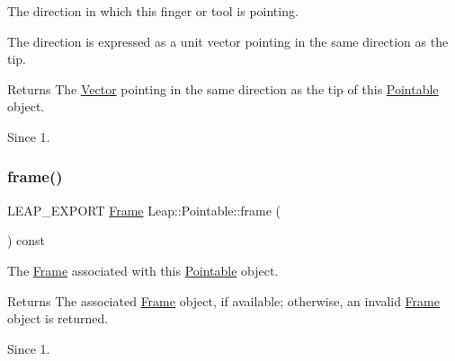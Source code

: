 The direction in which this finger or tool is pointing.


\begin{DoxyCodeInclude}
\end{DoxyCodeInclude}


The direction is expressed as a unit vector pointing in the same direction as the tip.



\begin{DoxyReturn}{Returns}
The \hyperlink{struct_leap_1_1_vector}{Vector} pointing in the same direction as the tip of this \hyperlink{class_leap_1_1_pointable}{Pointable} object. 
\end{DoxyReturn}
\begin{DoxySince}{Since}
1. 
\end{DoxySince}
\mbox{\label{class_leap_1_1_pointable_a3519d0129ec49ea005d047bc8805c27f}} 
\subsubsection{\texorpdfstring{frame()}{frame()}}
{\footnotesize\ttfamily L\+E\+A\+P\+\_\+\+E\+X\+P\+O\+RT \hyperlink{class_leap_1_1_frame}{Frame} Leap\+::\+Pointable\+::frame (\begin{DoxyParamCaption}{ }\end{DoxyParamCaption}) const}

The \hyperlink{class_leap_1_1_frame}{Frame} associated with this \hyperlink{class_leap_1_1_pointable}{Pointable} object.


\begin{DoxyCodeInclude}
\end{DoxyCodeInclude}


\begin{DoxyReturn}{Returns}
The associated \hyperlink{class_leap_1_1_frame}{Frame} object, if available; otherwise, an invalid \hyperlink{class_leap_1_1_frame}{Frame} object is returned. 
\end{DoxyReturn}
\begin{DoxySince}{Since}
1. 
\end{DoxySince}
\mbox{\label{class_leap_1_1_pointable_a89be2f42b609738fc1869e23be4a0374}} 
